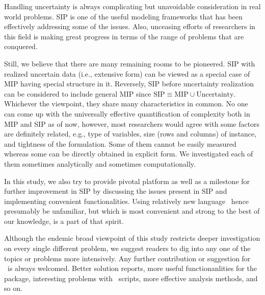 Handling uncertainty is always complicating but unavoidable consideration in real world problems. SIP is one of the useful modeling frameworks that has been effectively addressing some of the issues. Also, unceasing efforts of researchers in this field is making great progress in terms of the range of problems that are conquered. 

Still, we believe that there are many remaining rooms to be pioneered. SIP with realized uncertain data (i.e., extensive form) can be viewed as a special case of MIP having special structure in it. Reversely, SIP before uncertainty realization can be considered to include general MIP since $\textrm{SIP}\equiv\textrm{MIP}\cup\textrm{Uncertainty}$. Whichever the viewpoint, they share many characteristics in common. No one can come up with the universally effective quantification of complexity both in MIP and SIP as of now, however, most researchers would agree with some factors are definitely related, e.g., type of variables, size (rows and columns) of instance, and tightness of the formulation. Some of them cannot be easily measured whereas some can be directly obtained in explicit form. We investigated each of them sometimes analytically and sometimes computationally.

In this study, we also try to provide pivotal platform as well as a milestone for further improvement in SIP by discussing the issues present in SIP and implementing convenient functionalities. Using relatively new language \julia\ hence presumably be unfamiliar, but which is most convenient and strong to the best of our knowledge, is a part of that spirit. 

Although the endemic broad viewpoint of this study restricts deeper investigation on every single different problem, we suggest readers to dig into any one of the topics or problems more intensively. Any further contribution or suggestion for \siplibtwo\ is always welcomed. Better solution reports, more useful functionanlities for the package, interesting problems with \julia\ scripts, more effective analysis methods, and so on.


